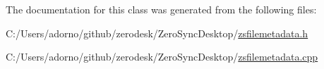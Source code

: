 The documentation for this class was generated from the following files\-:\begin{DoxyCompactItemize}
\item 
C\-:/\-Users/adorno/github/zerodesk/\-Zero\-Sync\-Desktop/\hyperlink{zsfilemetadata_8h}{zsfilemetadata.\-h}\item 
C\-:/\-Users/adorno/github/zerodesk/\-Zero\-Sync\-Desktop/\hyperlink{zsfilemetadata_8cpp}{zsfilemetadata.\-cpp}\end{DoxyCompactItemize}
